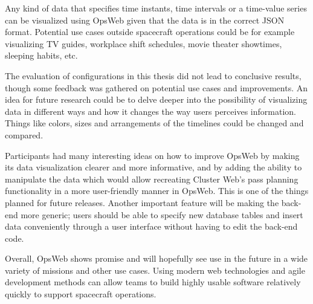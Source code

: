Any kind of data that specifies time instants, time intervals or a time-value series can be visualized using OpsWeb given that the data is in the correct JSON format. Potential use cases outside spacecraft operations could be for example visualizing TV guides, workplace shift schedules, movie theater showtimes, sleeping habits, etc.

The evaluation of configurations in this thesis did not lead to conclusive results, though some feedback was gathered on potential use cases and improvements. An idea for future research could be to delve deeper into the possibility of visualizing data in different ways and how it changes the way users perceives information. Things like colors, sizes and arrangements of the timelines could be changed and compared.

Participants had many interesting ideas on how to improve OpsWeb by making its data visualization clearer and more informative, and by adding the ability to manipulate the data which would allow recreating Cluster Web's pass planning functionality in a more user-friendly manner in OpsWeb. This is one of the things planned for future releases. Another important feature will be making the back-end more generic; users should be able to specify new database tables and insert data conveniently through a user interface without having to edit the back-end code.

Overall, OpsWeb shows promise and will hopefully see use in the future in a wide variety of missions and other use cases. Using modern web technologies and agile development methods can allow teams to build highly usable software relatively quickly to support spacecraft operations.